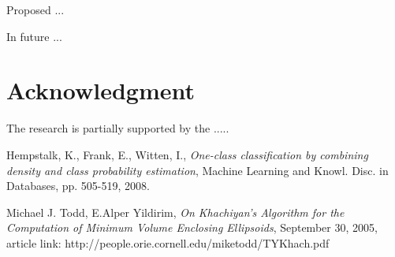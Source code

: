 \documentclass{llncs}
\begin{document}
Proposed ...

In future ...


\section*{Acknowledgment}

\noindent The research is partially supported by the .....

\begin{thebibliography}{1}

Hempstalk, K., Frank, E., Witten, I., \emph{One-class classification by combining density and class probability estimation}, Machine Learning and Knowl. Disc. in Databases, pp. 505-519, 2008.

Michael J. Todd, E.Alper Yildirim, \emph{On Khachiyan's Algorithm for the Computation of Minimum Volume Enclosing Ellipsoids}, September 30, 2005, article link: http://people.orie.cornell.edu/miketodd/TYKhach.pdf


\end{thebibliography}
\end{document}
